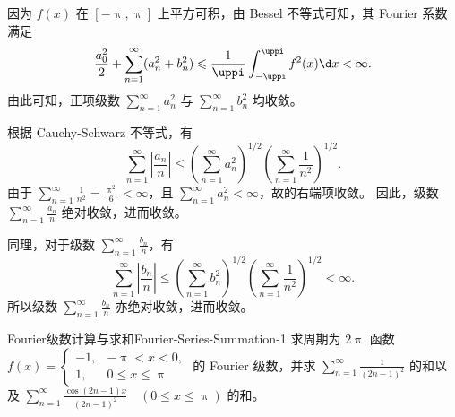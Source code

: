 \begin{myproof}
    因为 $f(x)$ 在 $[-\uppi, \uppi]$ 上平方可积，由 Bessel 不等式可知，其 Fourier 系数满足
    \begin{equation}
        \frac{a_0^2}{2} + \sum_{n=1}^{\infty} (a_n^2 + b_n^2) \leqslant \frac{1}{\uppi} \int_{-\uppi}^{\uppi} f^2(x) \d x < \infty.
    \end{equation}
    由此可知，正项级数 $\sum_{n=1}^{\infty} a_n^2$ 与 $\sum_{n=1}^{\infty} b_n^2$ 均收敛。

    根据 Cauchy-Schwarz 不等式，有
    \begin{equation}\label{eq:cauchy-2}
        \sum_{n=1}^{\infty} \left| \frac{a_n}{n} \right| \leqslant \left( \sum_{n=1}^{\infty} a_n^2 \right)^{1/2} \left( \sum_{n=1}^{\infty} \frac{1}{n^2} \right)^{1/2}.
    \end{equation}
    由于 $\sum_{n=1}^{\infty} \frac{1}{n^2} = \frac{\uppi^2}{6} < \infty$，且 $\sum_{n=1}^{\infty} a_n^2 < \infty$，故的右端项收敛。
    因此，级数 $\sum_{n=1}^{\infty} \frac{a_n}{n}$ 绝对收敛，进而收敛。

    同理，对于级数 $\sum_{n=1}^{\infty} \frac{b_n}{n}$，有
    \begin{equation}
        \sum_{n=1}^{\infty} \left| \frac{b_n}{n} \right| \leqslant \left( \sum_{n=1}^{\infty} b_n^2 \right)^{1/2} \left( \sum_{n=1}^{\infty} \frac{1}{n^2} \right)^{1/2} < \infty.
    \end{equation}
    所以级数 $\sum_{n=1}^{\infty} \frac{b_n}{n}$ 亦绝对收敛，进而收敛。
\end{myproof}

\begin{problem}{Fourier级数计算与求和}{Fourier-Series-Summation-1}
    求周期为 $2\uppi$ 函数 $f(x) = \begin{cases} -1, & -\uppi < x < 0, \\ 1, & 0 \leqslant x \leqslant \uppi \end{cases}$ 的 Fourier 级数，并求 $\sum_{n=1}^{\infty} \frac{1}{(2n-1)^2}$ 的和以及 $\sum_{n=1}^{\infty} \frac{\cos(2n-1)x}{(2n-1)^2} \quad (0 \leqslant x \leqslant \uppi)$ 的和。
\end{problem}

